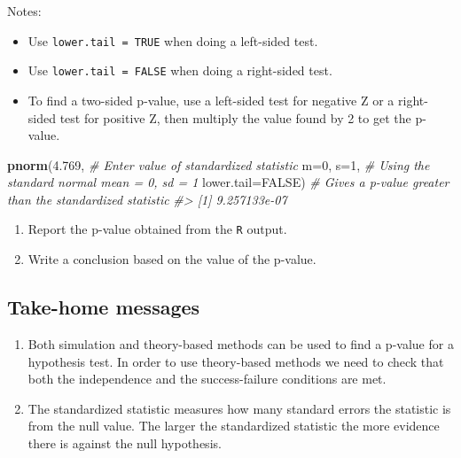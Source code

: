 \documentclass[
]{report}
\newenvironment{Shaded}{\begin{snugshade}}{\end{snugshade}}
\newcommand{\AttributeTok}[1]{\textcolor[rgb]{0.13,0.29,0.53}{#1}}
\newcommand{\CommentTok}[1]{\textcolor[rgb]{0.56,0.35,0.01}{\textit{#1}}}
\newcommand{\ConstantTok}[1]{\textcolor[rgb]{0.56,0.35,0.01}{#1}}
\newcommand{\DecValTok}[1]{\textcolor[rgb]{0.00,0.00,0.81}{#1}}
\newcommand{\FloatTok}[1]{\textcolor[rgb]{0.00,0.00,0.81}{#1}}
\newcommand{\FunctionTok}[1]{\textcolor[rgb]{0.13,0.29,0.53}{\textbf{#1}}}
\newcommand{\NormalTok}[1]{#1}
\providecommand{\tightlist}{%
  \setlength{\itemsep}{0pt}\setlength{\parskip}{0pt}}
\begin{document}
Notes:

\begin{itemize}
\tightlist
\item
  Use \texttt{lower.tail\ =\ TRUE} when doing a left-sided test.
\item
  Use \texttt{lower.tail\ =\ FALSE} when doing a right-sided test.
\item
  To find a two-sided p-value, use a left-sided test for negative Z or a right-sided test for positive Z, then multiply the value found by 2 to get the p-value.
\end{itemize}

\begin{Shaded}
\begin{Highlighting}[]
\FunctionTok{pnorm}\NormalTok{(}\FloatTok{4.769}\NormalTok{, }\CommentTok{\# Enter value of standardized statistic}
      \AttributeTok{m=}\DecValTok{0}\NormalTok{, }\AttributeTok{s=}\DecValTok{1}\NormalTok{, }\CommentTok{\# Using the standard normal mean = 0, sd = 1}
      \AttributeTok{lower.tail=}\ConstantTok{FALSE}\NormalTok{) }\CommentTok{\# Gives a p{-}value greater than the standardized statistic}
\CommentTok{\#\textgreater{} [1] 9.257133e{-}07}
\end{Highlighting}
\end{Shaded}

\begin{enumerate}
\def\labelenumi{\arabic{enumi}.}
\setcounter{enumi}{9}
\item
  Report the p-value obtained from the \texttt{R} output.
  \vspace{0.3in}
\item
  Write a conclusion based on the value of the p-value.
\end{enumerate}

\vspace{0.6in}

\hypertarget{take-home-messages-10}{%
\subsection{Take-home messages}\label{take-home-messages-10}}

\begin{enumerate}
\def\labelenumi{\arabic{enumi}.}
\item
  Both simulation and theory-based methods can be used to find a p-value for a hypothesis test. In order to use theory-based methods we need to check that both the independence and the success-failure conditions are met.
\item
  The standardized statistic measures how many standard errors the statistic is from the null value. The larger the standardized statistic the more evidence there is against the null hypothesis.
\end{enumerate}
\end{document}
